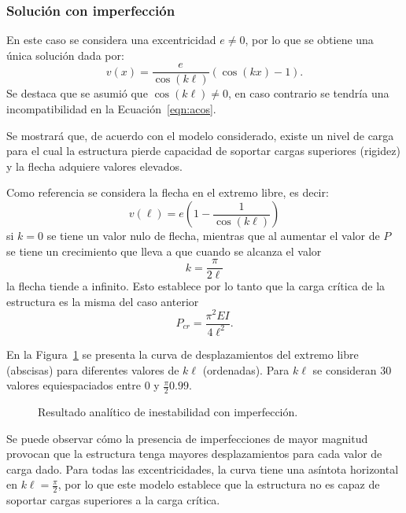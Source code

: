 \subsubsection{Solución con imperfección}

En este caso se considera una excentricidad $e \neq 0$, por lo que se obtiene una única solución dada por:
%
\begin{equation}
v(x) = \frac{e}{\cos(k\ell)} (\cos(k x) -1).
\end{equation}
%
Se destaca que se asumió que $\cos(k \ell) \neq 0$, en caso contrario se tendría una incompatibilidad en la Ecuación~\eqref{eqn:acos}. %

Se mostrará que, de acuerdo con el modelo considerado, existe un nivel de carga para el cual la estructura pierde capacidad de soportar cargas superiores (rigidez) y la flecha adquiere valores elevados. %
%

Como referencia se considera la flecha en el extremo libre, es decir:
%
\begin{equation}
v(\ell) = e \left( 1- \frac{1}{\cos(k\ell) }  \right)
\end{equation}
%
si $k=0$ se tiene un valor nulo de flecha, mientras que al aumentar el valor de $P$ se tiene un crecimiento que lleva a que cuando se alcanza el valor 
%
\begin{equation}
k = \frac{\pi}{2 \ell }
\end{equation}
%
la flecha tiende a infinito. %
%
Esto establece por lo tanto que la carga crítica de la estructura es la misma del caso anterior
%
\begin{equation}
\boxed{
	P_{cr} = \frac{\pi^2 E I}{4 \ell^2}.
}
\end{equation}


En la Figura~\ref{fig:ejpand} se presenta la curva de desplazamientos del extremo libre (abscisas) para diferentes valores de $k\ell$ (ordenadas). %
%
Para $k\ell$ se consideran 30 valores equiespaciados entre $0$ y $\frac{\pi}{2} 0.99$.

\begin{figure}[htb]
	\centering
		\resizebox{.7\textwidth}{!}{}
	\caption{Resultado analítico de inestabilidad con imperfección.}
	\label{fig:ejpand}
\end{figure}

Se puede observar cómo la presencia de imperfecciones de mayor magnitud provocan que la estructura tenga mayores desplazamientos para cada valor de carga dado. %
%
Para todas las excentricidades, la curva tiene una asíntota horizontal en $k\ell=\frac{\pi}{2}$, por lo que este modelo establece que la estructura no es capaz de soportar cargas superiores a la carga crítica.


